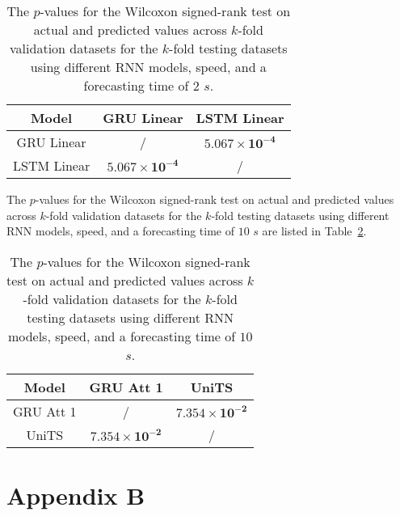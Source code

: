 \begin{table}[!ht]
	\centering
	\begin{tabular}{|c|c|c|}
		\hline
		Model & GRU Linear & LSTM Linear \\ \hline
		GRU Linear & / & $\mathbf{5.067 \times 10^{-4}}$ \\ \hline
		LSTM Linear & $\mathbf{5.067 \times 10^{-4}}$ & / \\ \hline
	\end{tabular}
	\caption{The $p$-values for the Wilcoxon signed-rank test on actual and predicted values across $k$-fold validation datasets for the $k$-fold testing datasets using different RNN models, speed, and a forecasting time of $2$ $s$.}
	\label{tab:speed:p:2}
\end{table}

The $p$-values for the Wilcoxon signed-rank test on actual and predicted values across $k$-fold validation datasets for the $k$-fold testing datasets using different RNN models, speed, and a forecasting time of $10$ $s$ are listed in Table~\ref{tab:speed:p:10}.

\begin{table}[!ht]
	\centering
	\begin{tabular}{|c|c|c|}
		\hline
		Model & GRU Att 1 & UniTS \\ \hline
		GRU Att 1 & / & $\mathbf{7.354 \times 10^{-2}}$ \\ \hline
		UniTS & $\mathbf{7.354 \times 10^{-2}}$ & / \\ \hline
	\end{tabular}
	\caption{The $p$-values for the Wilcoxon signed-rank test on actual and predicted values across $k$-fold validation datasets for the $k$-fold testing datasets using different RNN models, speed, and a forecasting time of $10$ $s$.}
	\label{tab:speed:p:10}
\end{table}

\appendix
\section{Appendix B}
\label{appB}

